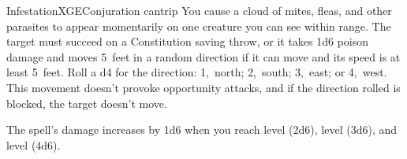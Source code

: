 \begin{spell}{Infestation}{XGE}{Conjuration cantrip}
{
}
You cause a cloud of mites, fleas, and other parasites to
appear momentarily on one creature you can see within
range. The target must succeed on a Constitution saving
throw, or it takes 1d6 poison damage and moves 5~feet
in a random direction if it can move and its speed is at
least 5~feet. Roll a d4 for the direction: 1,~north; 2,~south;
3,~east; or 4,~west. This movement doesn't provoke opportunity
attacks, and if the direction rolled is blocked,
the target doesn't move.

The spell's damage increases by 1d6 when you reach
 level (2d6),  level (3d6), and  level (4d6).
\end{spell}